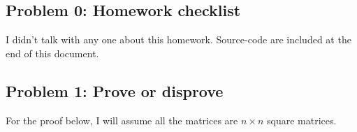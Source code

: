 \documentclass{article}
\begin{document}
 



\hypertarget{problem_0_homework_checklist_2}{}
\subsection*{{Problem 0: Homework checklist}}
\label{problem_0_homework_checklist_2}

\checkmark	I didn't talk with any one about this homework. \newline
\checkmark 	Source-code are included at the end of this document. 


\hypertarget{problem_1_prove_or_disprove_3}{}
\subsection*{{Problem 1: Prove or disprove}}
\label{problem_1_prove_or_disprove_3}

For the proof below, I will assume all the matrices are $n\times n$ square matrices.                                                                
\end{document}

